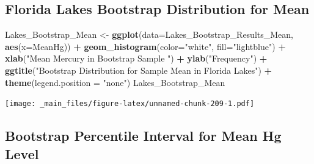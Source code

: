 \documentclass[]{book}
\newenvironment{Shaded}{\begin{snugshade}}{\end{snugshade}}
\newcommand{\KeywordTok}[1]{\textcolor[rgb]{0.13,0.29,0.53}{\textbf{#1}}}
\newcommand{\DataTypeTok}[1]{\textcolor[rgb]{0.13,0.29,0.53}{#1}}
\newcommand{\DecValTok}[1]{\textcolor[rgb]{0.00,0.00,0.81}{#1}}
\newcommand{\FloatTok}[1]{\textcolor[rgb]{0.00,0.00,0.81}{#1}}
\newcommand{\StringTok}[1]{\textcolor[rgb]{0.31,0.60,0.02}{#1}}
\newcommand{\OperatorTok}[1]{\textcolor[rgb]{0.81,0.36,0.00}{\textbf{#1}}}
\newcommand{\NormalTok}[1]{#1}
\begin{document}
\subsection{Florida Lakes Bootstrap Distribution for
Mean}\label{florida-lakes-bootstrap-distribution-for-mean}

\begin{Shaded}
\begin{Highlighting}[]
\NormalTok{Lakes_Bootstrap_Mean <-}\StringTok{ }\KeywordTok{ggplot}\NormalTok{(}\DataTypeTok{data=}\NormalTok{Lakes_Bootstrap_Results_Mean, }\KeywordTok{aes}\NormalTok{(}\DataTypeTok{x=}\NormalTok{MeanHg)) }\OperatorTok{+}\StringTok{  }
\StringTok{  }\KeywordTok{geom_histogram}\NormalTok{(}\DataTypeTok{color=}\StringTok{"white"}\NormalTok{, }\DataTypeTok{fill=}\StringTok{"lightblue"}\NormalTok{) }\OperatorTok{+}
\StringTok{  }\KeywordTok{xlab}\NormalTok{(}\StringTok{"Mean Mercury in Bootstrap Sample "}\NormalTok{) }\OperatorTok{+}\StringTok{ }\KeywordTok{ylab}\NormalTok{(}\StringTok{"Frequency"}\NormalTok{) }\OperatorTok{+}
\StringTok{  }\KeywordTok{ggtitle}\NormalTok{(}\StringTok{"Bootstrap Distribution for Sample Mean in Florida Lakes"}\NormalTok{) }\OperatorTok{+}\StringTok{ }
\StringTok{  }\KeywordTok{theme}\NormalTok{(}\DataTypeTok{legend.position =} \StringTok{"none"}\NormalTok{)}
\NormalTok{Lakes_Bootstrap_Mean}
\end{Highlighting}
\end{Shaded}

\texttt{[image: \_main\_files/figure-latex/unnamed-chunk-209-1.pdf]}

\subsection{Bootstrap Percentile Interval for Mean Hg
Level}\label{bootstrap-percentile-interval-for-mean-hg-level}

\begin{Shaded}
\end{Shaded}
\end{document}
